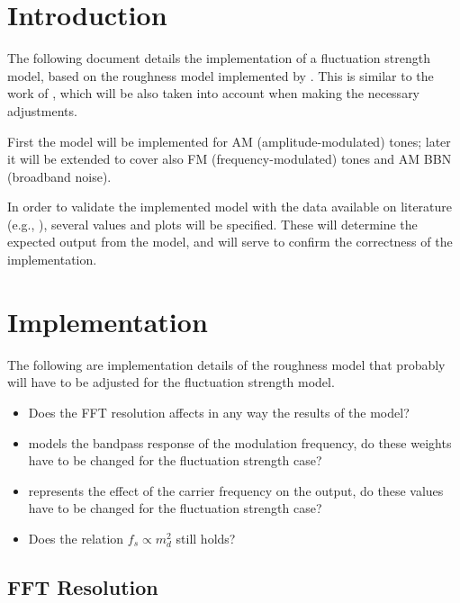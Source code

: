 \documentclass[a4paper]{article}
\begin{document}

\section{Introduction}

The following document details the implementation of a fluctuation strength
model, based on the roughness model implemented by \citet{Schrader2002}.
This is similar to the work of \citet{Sontacchi1998}, which will be also
taken into account when making the necessary adjustments.

First the model will be implemented for AM (amplitude-modulated) tones; later it
will be extended to cover also FM (frequency-modulated) tones and AM BBN
(broadband noise).

In order to validate the implemented model with the data available on literature
(e.g., \citet{Fastl2007Psychoacoustics}), several values and plots will be
specified. These will determine the expected output from the model, and will
serve to confirm the correctness of the implementation.

\section{Implementation}

The following are implementation details of the roughness model that probably
will have to be adjusted for the fluctuation strength model.

\begin{itemize}
    \item Does the FFT resolution affects in any way the results of the model?
    \item {} models the bandpass response of the modulation
        frequency, do these weights have to be changed for the fluctuation
        strength case?
    \item {} represents the effect of the carrier frequency on
        the output, do these values have to be changed for the fluctuation
        strength case?
    \item Does the relation $f_s \propto m_d ^ 2$ still holds?
\end{itemize}

\subsection{FFT Resolution}
\end{document}

